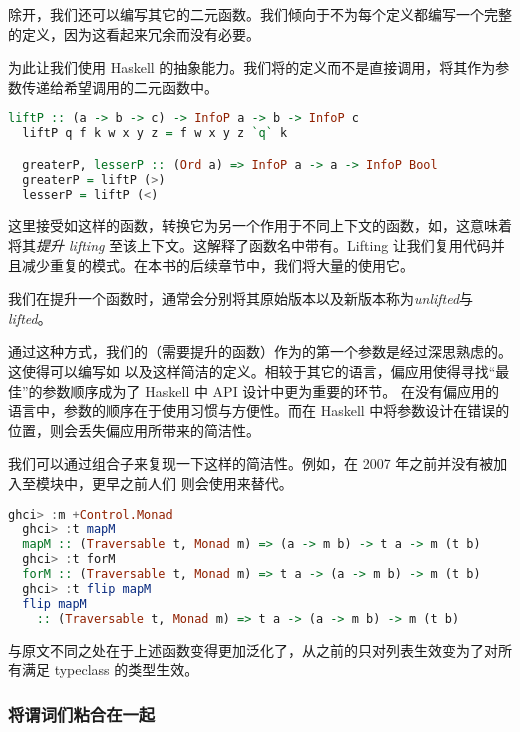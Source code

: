 \documentclass[./main.tex]{subfiles}
\begin{document}
除开，我们还可以编写其它的二元函数。我们倾向于不为每个定义都编写一个完整的定义，因为这看起来冗余而没有必要。

为此让我们使用 Haskell 的抽象能力。我们将的定义而不是直接调用\acode{(==)}，将其作为参数传递给希望调用的二元函数中。

\begin{lstlisting}[language=Haskell]
  liftP :: (a -> b -> c) -> InfoP a -> b -> InfoP c
  liftP q f k w x y z = f w x y z `q` k

  greaterP, lesserP :: (Ord a) => InfoP a -> a -> InfoP Bool
  greaterP = liftP (>)
  lesserP = liftP (<)
\end{lstlisting}

这里接受如\acode{(>)}这样的函数，转换它为另一个作用于不同上下文的函数，如，这意味着将其\textit{提升 lifting}
至该上下文。这解释了函数名中带有。Lifting 让我们复用代码并且减少重复的模式。在本书的后续章节中，我们将大量的使用它。

我们在提升一个函数时，通常会分别将其原始版本以及新版本称为\textit{unlifted}与\textit{lifted}。

通过这种方式，我们的（需要提升的函数）作为的第一个参数是经过深思熟虑的。这使得可以编写如
以及这样简洁的定义。相较于其它的语言，偏应用使得寻找“最佳”的参数顺序成为了 Haskell 中 API 设计中更为重要的环节。
在没有偏应用的语言中，参数的顺序在于使用习惯与方便性。而在 Haskell 中将参数设计在错误的位置，则会丢失偏应用所带来的简洁性。

我们可以通过组合子来复现一下这样的简洁性。例如，在 2007 年之前并没有被加入至模块中，更早之前人们
则会使用来替代。

\begin{lstlisting}[language=Haskell]
  ghci> :m +Control.Monad
  ghci> :t mapM
  mapM :: (Traversable t, Monad m) => (a -> m b) -> t a -> m (t b)
  ghci> :t forM
  forM :: (Traversable t, Monad m) => t a -> (a -> m b) -> m (t b)
  ghci> :t flip mapM
  flip mapM
    :: (Traversable t, Monad m) => t a -> (a -> m b) -> m (t b)
\end{lstlisting}

与原文不同之处在于上述函数变得更加泛化了，从之前的只对列表生效变为了对所有满足 typeclass 的类型生效。

\subsubsection*{将谓词们粘合在一起}
\end{document}
